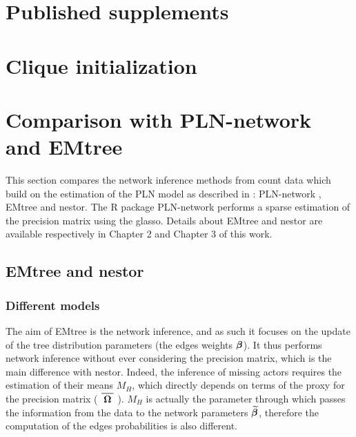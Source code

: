 
 
 












\begin{subappendices}
\section{Published supplements}
 


\section{Clique initialization}
\section{Comparison with PLN-network and EMtree}
This section compares the network inference methods from count data which build on the estimation of the PLN model as described in \citet{CMR18}: PLN-network \citep{CMR19}, EMtree and nestor. The R package PLN-network performs a sparse estimation of the precision matrix using the glasso. Details about EMtree and nestor are available respectively in Chapter 2 and Chapter 3 of this work.
\tocless\subsection{EMtree and nestor}
\subsubsection*{Different models}

The aim of EMtree is the network inference, and as such it focuses on the update of the tree distribution parameters (the edges weights ${\boldsymbol{\beta}}$). It thus performs network inference without ever considering the precision matrix, which is the main difference with nestor.  Indeed, the inference of missing actors requires the estimation of their means $M_H$, which directly depends on terms of the proxy for the precision matrix ($\xbar{\Omegabf}$). $M_H$ is actually the parameter through which passes the information from the data to the network parameters ${\widetilde{{\boldsymbol{\beta}}}}$, therefore the computation of the edges probabilities is also different. 


\end{subappendices}
